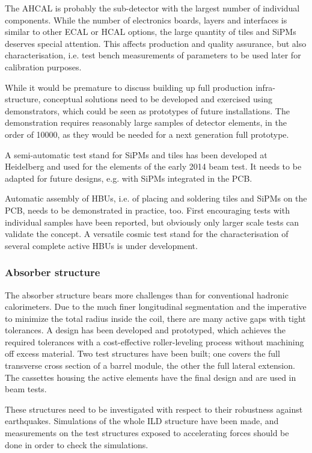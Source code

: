 The AHCAL is probably the sub-detector with the largest number of individual components. While the number of electronics boards, layers and interfaces is similar to other ECAL or HCAL options, the large quantity of tiles and SiPMs deserves special attention. This affects production and quality assurance, but also characterisation, i.e. test bench measurements of parameters to be used later for calibration purposes.

While it would be premature to discuss building up full production infra-structure, conceptual solutions need to be developed and exercised using demonstrators, which could be seen as prototypes of future installations. The demonstration requires reasonably large samples of detector elements, in the order of 10000, as they would be needed for a next generation full prototype.

A semi-automatic test stand for SiPMs and tiles has been developed at Heidelberg and used for the elements of the early 2014 beam test. It needs to be adapted for future designs, e.g. with SiPMs integrated in the PCB.

Automatic assembly of HBUs, i.e. of placing and soldering tiles and SiPMs on the PCB, needs to be demonstrated in practice, too. First encouraging tests with individual samples have been reported, but obviously only larger scale tests can validate the concept. A versatile cosmic test stand for the characterisation of several complete active HBUs is under development.

\subsubsection{Absorber structure}

The absorber structure bears more challenges than for conventional hadronic calorimeters. Due to the much finer longitudinal segmentation and the imperative to minimize the total radius inside the coil, there are many active gaps with tight tolerances. A design has been developed and prototyped, which achieves the required tolerances with a cost-effective roller-leveling process without machining off excess material. Two test structures have been built; one covers the full transverse cross section of a barrel module, the other the full lateral extension. The cassettes housing the active elements have the final design and are used in beam tests.

These structures need to be investigated with respect to their robustness against earthquakes. Simulations of the whole ILD structure have been made, and measurements on the test structures exposed to accelerating forces should be done in order to check the simulations.

